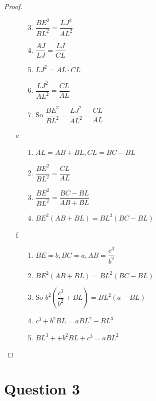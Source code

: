 \documentclass{article}
\begin{document}
\begin{proof}
\begin{enumerate}
\begin{enumerate}
            \item[3.] $\dfrac{BE^2}{BL^2}=\dfrac{LJ^2}{AL^2}$
            \item[4.] $\dfrac{AJ}{LJ}=\dfrac{LJ}{CL}$
            \item[5.] $LJ^2=AL\cdot CL$
            \item[6.] $\dfrac{LJ^2}{AL^2}=\dfrac{CL}{AL}$
            \item[7.] So $\dfrac{BE^2}{BL^2}=\dfrac{LJ^2}{AL^2}=\dfrac{CL}{AL}$
        \end{enumerate}
        \item[e] \begin{enumerate}
            \item[1.] $AL=AB+BL,CL=BC-BL$
            \item[2.] $\dfrac{BE^2}{BL^2}=\dfrac{CL}{AL}$
            \item[3.] $\dfrac{BE^2}{BL^2}=\dfrac{BC-BL}{AB+BL}$
            \item[4.] $BE^2(AB+BL)=BL^2(BC-BL)$
        \end{enumerate}
        \item[f] \begin{enumerate}
            \item[1.] $BE=b,BC=a, AB =\dfrac{c^3}{b^2}$
            \item[2.] $BE^2(AB+BL)=BL^2(BC-BL)$
            \item[3.] So $b^2\left(\dfrac{c^3}{b^2}+BL\right)=BL^2(a-BL)$
            \item[4.] $c^3+b^2BL=aBL^2-BL^3$
            \item[5.] $BL^3++b^2BL+c^3=aBL^2$
        \end{enumerate}
    \end{enumerate}
\end{proof}

\newpage

\section*{Question 3}

~
\end{document}
